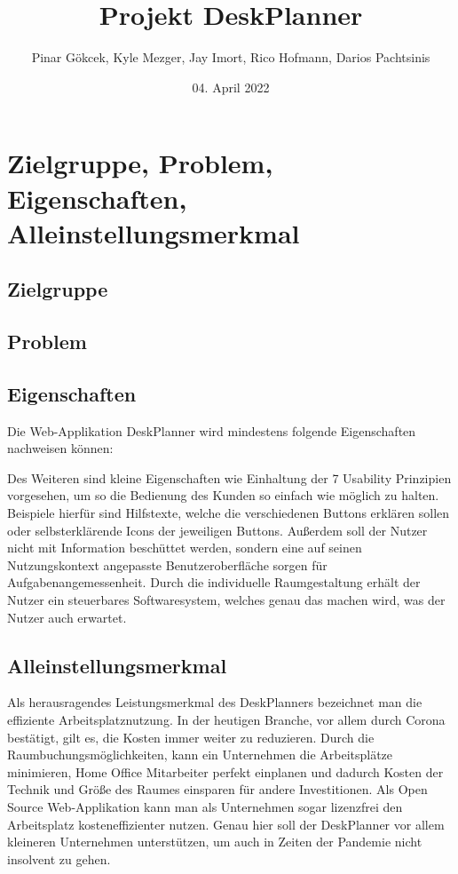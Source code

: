 \documentclass{article}
\title{Projekt DeskPlanner}
\author{Pinar Gökcek, Kyle Mezger, Jay Imort, Rico Hofmann, Darios Pachtsinis}
\date{04. April 2022}
\begin{document}
\begin{titlepage}
    \centering
    \maketitle

    \vfill

\end{titlepage}

\tableofcontents

\pagebreak

\section{Zielgruppe, Problem, Eigenschaften, Alleinstellungsmerkmal}

\subsection{Zielgruppe}

\subsection{Problem}

\subsection{Eigenschaften}
Die Web-Applikation DeskPlanner wird mindestens folgende Eigenschaften nachweisen können:


Des Weiteren sind kleine Eigenschaften wie Einhaltung der 7 Usability Prinzipien
vorgesehen, um so die Bedienung des Kunden so einfach wie möglich zu halten. 
Beispiele hierfür sind Hilfstexte, welche die verschiedenen Buttons erklären sollen
oder selbsterklärende Icons der jeweiligen Buttons. Außerdem soll der Nutzer nicht
mit Information beschüttet werden, sondern eine auf seinen Nutzungskontext
angepasste Benutzeroberfläche sorgen für Aufgabenangemessenheit. Durch die 
individuelle Raumgestaltung erhält der Nutzer ein steuerbares Softwaresystem,
welches genau das machen wird, was der Nutzer auch erwartet.

\subsection{Alleinstellungsmerkmal}
Als herausragendes Leistungsmerkmal des DeskPlanners bezeichnet man die 
effiziente Arbeitsplatznutzung. In der heutigen Branche, vor allem durch Corona 
bestätigt, gilt es, die Kosten immer weiter zu reduzieren. Durch die 
Raumbuchungsmöglichkeiten, kann ein Unternehmen die Arbeitsplätze minimieren, Home Office
Mitarbeiter perfekt einplanen und dadurch Kosten der Technik und Größe des Raumes
einsparen für andere Investitionen. Als Open Source Web-Applikation kann man
als Unternehmen sogar lizenzfrei den Arbeitsplatz kosteneffizienter nutzen.
Genau hier soll der DeskPlanner vor allem kleineren Unternehmen unterstützen, um 
auch in Zeiten der Pandemie nicht insolvent zu gehen.
\end{document}
